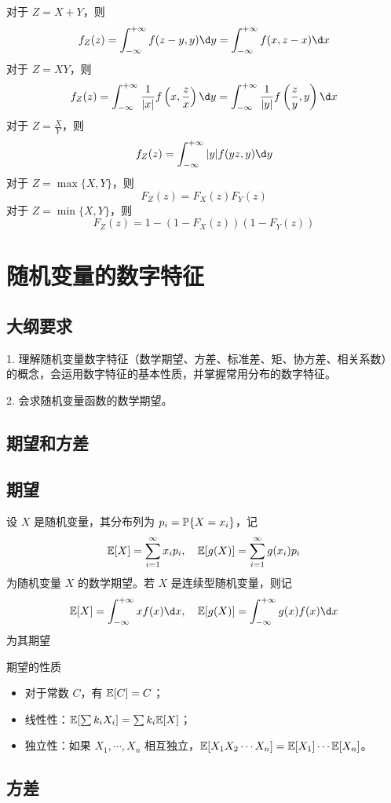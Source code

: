 对于 $Z = X + Y$，则
\[ f_Z(z) = \int_{-\infty}^{+\infty} f(z - y, y) \d y = \int_{-\infty}^{+\infty} f(x, z - x) \d x \]
对于 $Z = XY$，则
\[ f_Z(z) = \int_{-\infty}^{+\infty} \frac{1}{|x|}f\left(x, \frac{z}{x}\right) \d y = \int_{-\infty}^{+\infty} \frac{1}{|y|}f\left(\frac{z}{y}, y\right) \d x \]
对于 $Z = \frac{X}{Y}$，则
\[ f_Z(z) = \int_{-\infty}^{+\infty} |y|f(yz, y) \d y \]
对于 $Z = \max\{X, Y\}$，则
\[ F_Z(z) = F_X(z)F_Y(z) \]
对于 $Z = \min\{X, Y\}$，则
\[ F_Z(z) = 1 - (1 - F_X(z))(1 - F_Y(z)) \]

\section{随机变量的数字特征}

\subsection{大纲要求}

1. 理解随机变量数字特征（数学期望、方差、标准差、矩、协方差、相关系数）的概念，会运用数字特征的基本性质，并掌握常用分布的数字特征。

2. 会求随机变量函数的数学期望。

\subsection{期望和方差}

\subsection*{期望}

设 $X$ 是随机变量，其分布列为 $p_i = \mathbb{P}\{X = x_i\}$，记
\[ \mathbb{E} [X] = \sum_{i=1}^\infty x_i p_i, \quad \mathbb{E}[g(X)] = \sum_{i=1}^\infty g(x_i) p_i \]
为随机变量 $X$ 的数学期望。若 $X$ 是连续型随机变量，则记
\[ \bbE [X] = \int_{-\infty}^{+\infty} x f(x) \d x, \quad \bbE[g(X)] = \int_{-\infty}^{+\infty} g(x) f(x) \d x \]
为其期望

期望的性质
\begin{itemize}
	\item 对于常数 $C$，有 $\mathbb{E}[C] = C$；
	\item 线性性：$\mathbb{E}[\sum k_iX_i] = \sum k_i \mathbb{E} [X]$；
	\item 独立性：如果 $X_1, \cdots, X_n$ 相互独立，$\mathbb{E}[X_1X_2\cdots X_n] = \mathbb{E}[X_1] \cdots \mathbb{E}[X_n]$。
\end{itemize}

\subsection*{方差}

